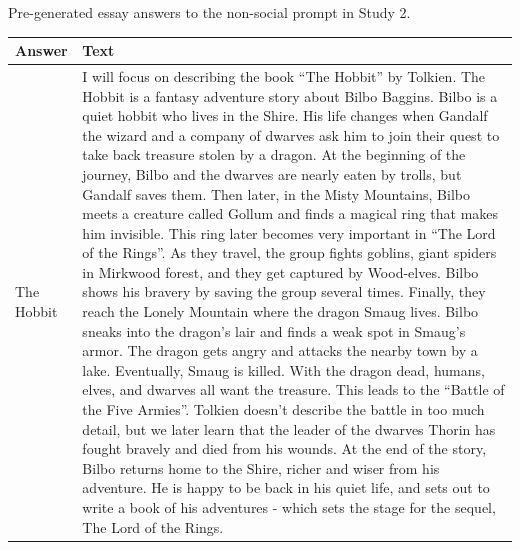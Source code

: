 \documentclass[
  man,
  floatsintext,
  longtable,
  nolmodern,
  notxfonts,
  notimes,
  colorlinks=true,linkcolor=blue,citecolor=blue,urlcolor=blue]{apa7}
\begin{document}
\begin{supptbl}[H]

\caption{\label{supptbl-essay-answers-nonsocial-study2}Pre-generated
essay answers to the non-social prompt in Study 2.}

\begin{minipage}{\linewidth}

\begingroup
\linespread{1}\selectfont
\centering\begingroup\fontsize{10}{12}\selectfont

\begin{tabular}{>{\raggedright\arraybackslash}p{2cm}>{\raggedright\arraybackslash}p{14cm}}
\toprule
Answer & Text\\
\midrule
The Hobbit & I will focus on describing the book “The Hobbit” by Tolkien. The Hobbit is a fantasy adventure story about Bilbo Baggins. Bilbo is a quiet hobbit who lives in the Shire. His life changes when Gandalf the wizard and a company of dwarves ask him to join their quest to take back treasure stolen by a dragon. At the beginning of the journey, Bilbo and the dwarves are nearly eaten by trolls, but Gandalf saves them. Then later, in the Misty Mountains, Bilbo meets a creature called Gollum and finds a magical ring that makes him invisible. This ring later becomes very important in “The Lord of the Rings”. As they travel, the group fights goblins, giant spiders in Mirkwood forest, and they get captured by Wood-elves. Bilbo shows his bravery by saving the group several times. Finally, they reach the Lonely Mountain where the dragon Smaug lives. Bilbo sneaks into the dragon's lair and finds a weak spot in Smaug's armor. The dragon gets angry and attacks the nearby town by a lake. Eventually, Smaug is killed. With the dragon dead, humans, elves, and dwarves all want the treasure. This leads to the “Battle of the Five Armies”. Tolkien doesn't describe the battle in too much detail, but we later learn that the leader of the dwarves Thorin has fought bravely and died from his wounds. At the end of the story, Bilbo returns home to the Shire, richer and wiser from his adventure. He is happy to be back in his quiet life, and sets out to write a book of his adventures - which sets the stage for the sequel, The Lord of the Rings.\\

\end{tabular}
\end{minipage}
\end{supptbl}
\end{document}
